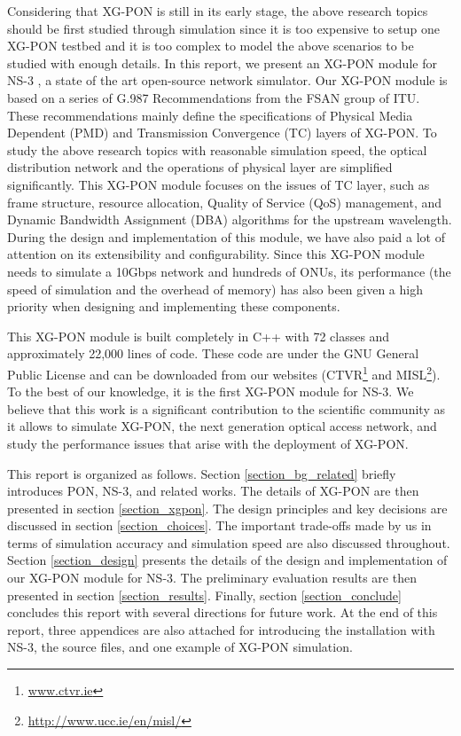 Considering that XG-PON is still in its early stage, the above
research topics should be first studied through simulation since
it is too expensive to setup one XG-PON testbed and it is too
complex to model the above scenarios to be studied with enough
details. In this report, we present an XG-PON module for NS-3
\cite{ns3}, a state of the art open-source network simulator. Our
XG-PON module is based on a series of G.987 Recommendations from
the FSAN group of ITU. These recommendations mainly define the
specifications of Physical Media Dependent (PMD) and Transmission
Convergence (TC) layers of XG-PON. To study the above research
topics with reasonable simulation speed, the optical distribution
network and the operations of physical layer are simplified
significantly. This XG-PON module focuses on the issues of TC
layer, such as frame structure, resource allocation, Quality of
Service (QoS) management, and Dynamic Bandwidth Assignment (DBA)
algorithms for the upstream wavelength. During the design and
implementation of this module, we have also paid a lot of
attention on its extensibility and configurability. Since this
XG-PON module needs to simulate a 10Gbps network and hundreds of
ONUs, its performance (the speed of simulation and the overhead of
memory) has also been given a high priority when designing and
implementing these components.

This XG-PON module is built completely in C++ with 72 classes and
approximately 22,000 lines of code. These code are under the GNU
General Public License and can be downloaded from our websites
(CTVR\footnote{\url{www.ctvr.ie}} and
MISL\footnote{\url{http://www.ucc.ie/en/misl/}}). To the best of
our knowledge, it is the first XG-PON module for NS-3. We believe
that this work is a significant contribution to the scientific
community as it allows to simulate XG-PON, the next generation
optical access network, and study the performance issues that
arise with the deployment of XG-PON.


This report is organized as follows. Section
\ref{section_bg_related} briefly introduces PON, NS-3, and related
works. The details of XG-PON are then presented in section
\ref{section_xgpon}. The design principles and key decisions are
discussed in section \ref{section_choices}. The important
trade-offs made by us in terms of simulation accuracy and
simulation speed are also discussed throughout. Section
\ref{section_design} presents the details of the design and
implementation of our XG-PON module for NS-3. The preliminary
evaluation results are then presented in section
\ref{section_results}. Finally, section \ref{section_conclude}
concludes this report with several directions for future work. At
the end of this report, three appendices are also attached for
introducing the installation with NS-3, the source files, and one
example of XG-PON simulation.
